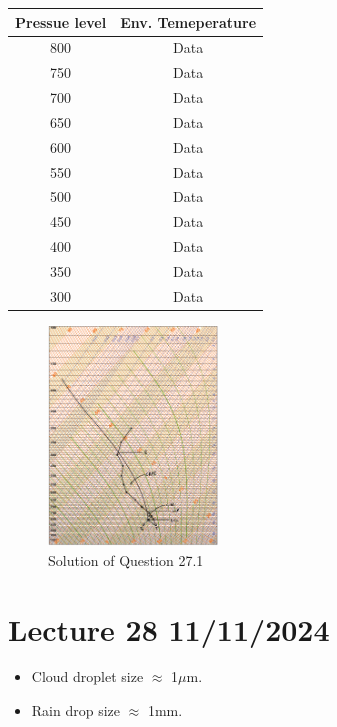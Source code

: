 \documentclass[fleqn,10pt]{SelfArx} %
\begin{document}
\begin{table}[h!]
\centering
\begin{tabular}{|c|c|}
\hline
\textbf{Pressue level} & \textbf{Env. Temeperature} \\
\hline
800 & Data \\
750 & Data \\
700 & Data \\
650 & Data \\
600 & Data \\
550 & Data \\
500 & Data \\
450 & Data \\
400 & Data \\
350 & Data \\
300 & Data \\
\hline
\end{tabular}
\end{table}

\begin{figure}[ht]
    \centering
        \includegraphics[width=0.4\textwidth]{Figures/Solution_L27_q1.png}
        \caption{Solution of Question {27.1}}
\end{figure}
\clearpage

\section{Lecture 28 11/11/2024}
\begin{itemize}[noitemsep]
    \item Cloud droplet size $\approx$ 1$\mu$m.
    \item Rain drop size $\approx$ 1mm.
\end{itemize}
\end{document}
